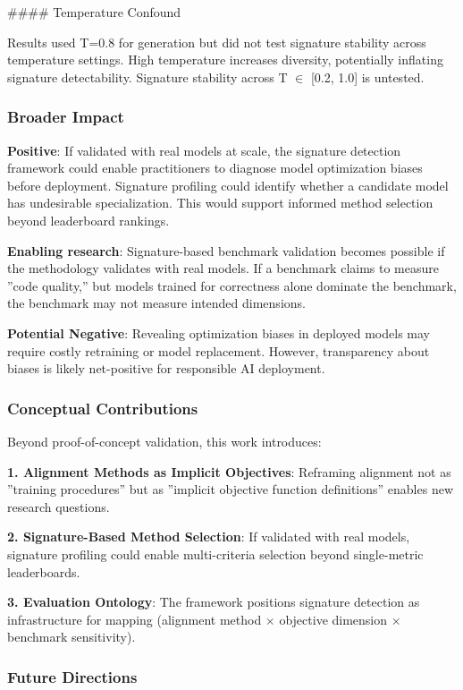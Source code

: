 \#\#\#\# Temperature Confound

Results used T=0.8 for generation but did not test signature stability across temperature settings. High temperature increases diversity, potentially inflating signature detectability. Signature stability across T $\in$ [0.2, 1.0] is untested.

\subsubsection{Broader Impact}

\textbf{Positive}: If validated with real models at scale, the signature detection framework could enable practitioners to diagnose model optimization biases before deployment. Signature profiling could identify whether a candidate model has undesirable specialization. This would support informed method selection beyond leaderboard rankings.

\textbf{Enabling research}: Signature-based benchmark validation becomes possible if the methodology validates with real models. If a benchmark claims to measure ''code quality,'' but models trained for correctness alone dominate the benchmark, the benchmark may not measure intended dimensions.

\textbf{Potential Negative}: Revealing optimization biases in deployed models may require costly retraining or model replacement. However, transparency about biases is likely net-positive for responsible AI deployment.

\subsubsection{Conceptual Contributions}

Beyond proof-of-concept validation, this work introduces:

\textbf{1. Alignment Methods as Implicit Objectives}: Reframing alignment not as ''training procedures'' but as ''implicit objective function definitions'' enables new research questions.

\textbf{2. Signature-Based Method Selection}: If validated with real models, signature profiling could enable multi-criteria selection beyond single-metric leaderboards.

\textbf{3. Evaluation Ontology}: The framework positions signature detection as infrastructure for mapping (alignment method $\times$ objective dimension $\times$ benchmark sensitivity).

\subsubsection{Future Directions}

